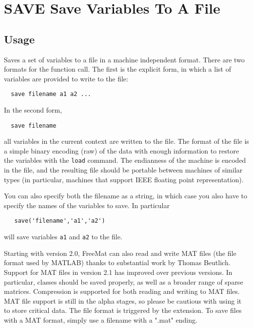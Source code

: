 \section{SAVE Save Variables To A File}

\subsection{Usage}

Saves a set of variables to a file in a machine independent format.
There are two formats for the function call.  The first is the explicit
form, in which a list of variables are provided to write to the file:
\begin{verbatim}
  save filename a1 a2 ...
\end{verbatim}
In the second form,
\begin{verbatim}
  save filename
\end{verbatim}
all variables in the current context are written to the file.  The 
format of the file is a simple binary encoding (raw) of the data
with enough information to restore the variables with the \verb|load|
command.  The endianness of the machine is encoded in the file, and
the resulting file should be portable between machines of similar
types (in particular, machines that support IEEE floating point 
representation).

You can also specify both the filename as a string, in which case
you also have to specify the names of the variables to save.  In
particular
\begin{verbatim}
   save('filename','a1','a2')
\end{verbatim}
will save variables \verb|a1| and \verb|a2| to the file.

Starting with version 2.0, FreeMat can also read and write MAT
files (the file format used by MATLAB) thanks to substantial 
work by Thomas Beutlich.  Support for MAT files in version 2.1
has improved over previous versions.  In particular, classes
should be saved properly, as well as a broader range of sparse
matrices.  Compression is supported for both reading and writing
to MAT files.  MAT file support is still in the alpha stages, so 
please be cautious with using it to store critical 
data.  The file format is triggered
by the extension.  To save files with a MAT format, simply
use a filename with a ".mat" ending.

